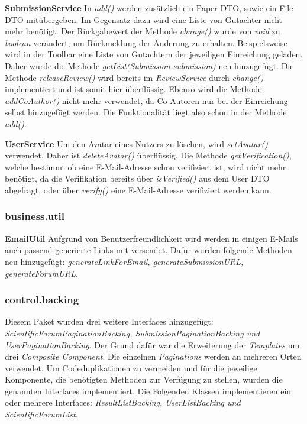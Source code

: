 \textbf{SubmissionService} In \emph{add()} werden zusätzlich ein Paper-DTO, sowie ein File-DTO mitübergeben. Im Gegensatz dazu wird eine Liste von Gutachter nicht mehr benötigt. \newline
Der Rückgabewert der Methode \emph{change()} wurde von \emph{void} zu \emph{boolean} verändert, um Rückmeldung der Änderung zu erhalten. \newline
Beispielsweise wird in der Toolbar eine Liste von Gutachtern der jeweiligen Einreichung geladen. Daher wurde die Methode \emph{getList(Submission submission)} neu hinzugefügt. \newline
Die Methode \emph{releaseReview()} wird bereits im \emph{ReviewService} durch \emph{change()} implementiert und ist somit hier überflüssig. \newline
Ebenso wird die Methode \emph{addCoAuthor()} nicht mehr verwendet, da Co-Autoren nur bei der Einreichung selbst hinzugefügt werden. Die Funktionalität liegt also schon in der Methode \emph{add()}.

\textbf{UserService} Um den Avatar eines Nutzers zu löschen, wird \emph{setAvatar()} verwendet. Daher ist \emph{deleteAvatar()} überflüssig. \newline
Die Methode \emph{getVerification()}, welche bestimmt ob eine E-Mail-Adresse schon verifiziert ist, wird nicht mehr benötigt, da die Verifikation bereits über \emph{isVerified()} aus dem User DTO abgefragt, oder über \emph{verify()} eine E-Mail-Adresse verifiziert werden kann.

\subsubsection{business.util}

\textbf{EmailUtil} Aufgrund von Benutzerfreundlichkeit wird
werden in einigen E-Mails auch passend generierte Links mit versendet. Dafür wurden folgende Methoden neu hinzugefügt: \emph{generateLinkForEmail, generateSubmissionURL, generateForumURL}.

\subsubsection{control.backing}

Diesem Paket wurden drei weitere Interfaces hinzugefügt: \emph{ScientificForumPaginationBacking, SubmissionPaginationBacking und UserPaginationBacking}. Der Grund dafür war die Erweiterung der \emph{Templates} um drei \emph{Composite Component}. Die einzelnen \emph{Paginations} werden an mehreren Orten verwendet. Um Codeduplikationen zu vermeiden und für die jeweilige Komponente, die benötigten Methoden zur Verfügung zu stellen, wurden die genannten Interfaces implementiert. Die Folgenden Klassen implementieren ein oder mehrere Interfaces: \emph{ResultListBacking, UserListBacking und ScientificForumList}.

